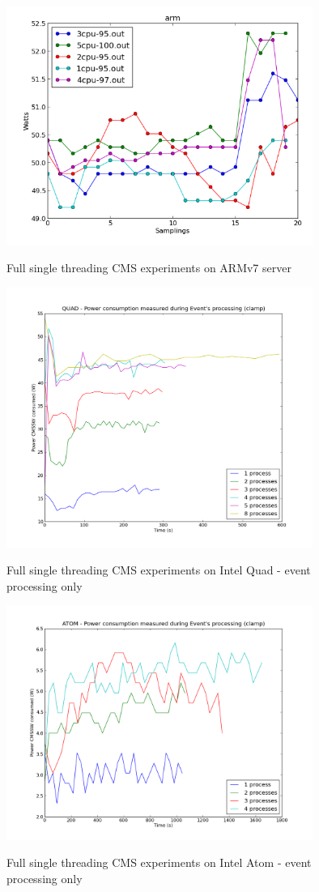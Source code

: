 \begin{figure}[h!]
  \centering
    \includegraphics[width=100mm]{"img/aalto/aalto_total_arm"}
    \label{fig:nf_ss}
    \caption{Full single threading CMS experiments on ARMv7 server}
\end{figure}


\begin{figure}[h!]
  \centering
    \includegraphics[width=100mm]{"img/aalto/aalto_quadEvents"}
    \label{fig:nf_ss}
    \caption{Full single threading CMS experiments on Intel Quad - event
processing only}
\end{figure}

\begin{figure}[h!]
  \centering
    \includegraphics[width=100mm]{"img/aalto/aalto_atomEvents"}
    \label{fig:nf_ss}
    \caption{Full single threading CMS experiments on Intel Atom - event
processing only}
\end{figure}



